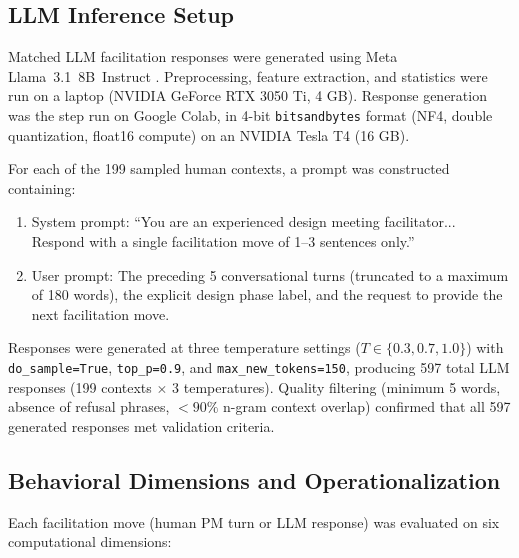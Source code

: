 \documentclass[preprint,12pt,authoryear]{elsarticle}
\begin{document}
\subsection{LLM Inference Setup}

Matched LLM facilitation responses were generated using Meta Llama~3.1~8B~Instruct \citep{dubey2024llama3}. Preprocessing, feature extraction, and statistics were run on a laptop (NVIDIA GeForce RTX 3050 Ti, 4 GB). Response generation was the step run on Google Colab, in 4-bit \texttt{bitsandbytes} format (NF4, double quantization, float16 compute) on an NVIDIA Tesla T4 (16 GB).

For each of the 199 sampled human contexts, a prompt was constructed containing:
\begin{enumerate}
    \item System prompt: ``You are an experienced design meeting facilitator... Respond with a single facilitation move of 1--3 sentences only.''
    \item User prompt: The preceding 5 conversational turns (truncated to a maximum of 180 words), the explicit design phase label, and the request to provide the next facilitation move.
\end{enumerate}

Responses were generated at three temperature settings ($T \in \{0.3, 0.7, 1.0\}$) with \texttt{do\_sample=True}, \texttt{top\_p=0.9}, and \texttt{max\_new\_tokens=150}, producing 597 total LLM responses (199 contexts $\times$ 3 temperatures). Quality filtering (minimum 5 words, absence of refusal phrases, $<90\%$ n-gram context overlap) confirmed that all 597 generated responses met validation criteria.

\subsection{Behavioral Dimensions and Operationalization}

Each facilitation move (human PM turn or LLM response) was evaluated on six computational dimensions:
\end{document}
